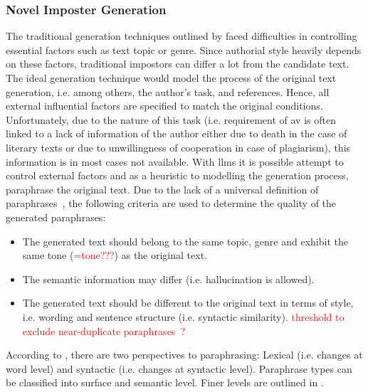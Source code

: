 \subsubsection{Novel Imposter Generation}
\label{subsubsec:novel_impostor_generation}
The traditional generation techniques outlined by \citet{koppel_determining_2014} faced difficulties in controlling essential factors such as text topic or genre.
Since authorial style heavily depends on these factors, traditional impostors can differ a lot from the candidate text.
The ideal generation technique would model the process of the original text generation, 
i.e. among others, the author's task, and references.
Hence, all external influential factors are specified to match the original conditions.
Unfortunately, due to the nature of this task 
(i.e. requirement of \ac{av} is often linked to a lack of information of the author either due to death in the case of literary texts or 
due to unwillingness of cooperation in case of plagiarism), this information is in most cases not available.
With \acp{llm} it is possible attempt to control external factors and 
as a heuristic to modelling the generation process, paraphrase the original text.
Due to the lack of a universal definition of paraphrases~\citep{gohsen_task_oriented_2024}, the following criteria are used to determine the quality of the generated paraphrases:
\begin{itemize}
    \item The generated text should belong to the same topic, genre and exhibit the same tone (\textcolor{red}{=tone???}) as the original text.
    \item The semantic information may differ (i.e. hallucination is allowed).
    \item The generated text should be different to the original text in terms of style, i.e. wording and sentence structure (i.e. syntactic similarity). \textcolor{red}{threshold to exclude near-duplicate paraphrases~\citep{gohsen_captions_2023}?}
\end{itemize}


According to \citet{gohsen_task_oriented_2024}, there are two perspectives to paraphrasing: 
Lexical (i.e. changes at word level) and syntactic (i.e. changes at syntactic level).
Paraphrase types can be classified into surface and semantic level. Finer levels are outlined in \citep{gohsen_task_oriented_2024}.

